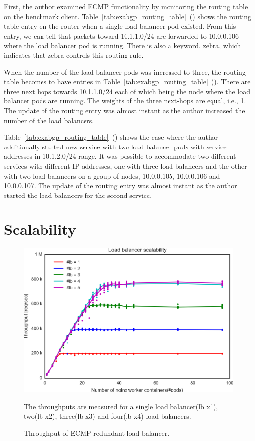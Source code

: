 First, the author examined ECMP functionality by monitoring the routing table on the benchmark client.
Table~\ref{tab:exabgp_routing_table}~() shows the routing table entry on the router when a single load balancer pod existed.
From this entry, we can tell that packets toward 10.1.1.0/24 are forwarded to 10.0.0.106 where the load balancer pod is running.
There is also a keyword, zebra, which indicates that zebra controls this routing rule.

When the number of the load balancer pods was increased to three, the routing table becomes to have entries in Table~\ref{tab:exabgp_routing_table}~().
There are three next hops towards 10.1.1.0/24 each of which being the node where the load balancer pods are running.
The weights of the three next-hops are equal, i.e., 1.
The update of the routing entry was almost instant as the author increased the number of the load balancers.

Table~\ref{tab:exabgp_routing_table}~() shows the case where the author additionally started new service with two load balancer pods with service addresses in 10.1.2.0/24 range.
It was possible to accommodate two different services with different IP addresses, one with three load balancers and the other with two load balancers on a group of nodes, 10.0.0.105, 10.0.0.106 and 10.0.0.107.
The update of the routing entry was almost instant as the author started the load balancers for the second service.

\FloatBarrier

\section{Scalability}

\begin{figure}[h]
  \includegraphics[width=0.9\columnwidth,left]{Figs/ecmp_lb_cubic}
  \caption{Throughput of ECMP redundant load balancer.}
The throughputs are measured for a single load balancer(lb x1), two(lb x2), three(lb x3) and four(lb x4) load balancers. 

\label{fig:ecmp_lb_cubic}
\end{figure}

